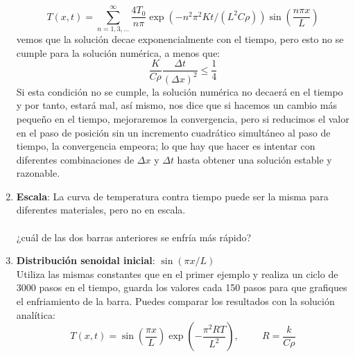 \documentclass[12pt]{article}
\begin{document}
\begin{enumerate}
\[ T(x,t) = \sum_{n=1,3,\ldots}^{\infty} \dfrac{4T_{0}}{n \pi} \exp(-n^{2} \pi^{2}Kt/(L^{2} C \rho)) \sin \left( \dfrac{n \pi x}{L} \right)  \]
vemos que la soluci\'{o}n decae exponencialmente con el tiempo, pero esto no se cumple para la soluci\'{o}n num\'{e}rica, a menos que:
\[ \dfrac{K}{C \rho} \dfrac{\Delta t}{(\Delta x)^{2}} \leq \dfrac{1}{4} \]
Si esta condici\'{o}n no se cumple, la soluci\'{o}n numérica no decaer\'{a} en el tiempo y por tanto, estar\'{a} mal, as\'{i} mismo, nos dice que si hacemos un cambio m\'{a}s pequeño en el tiempo, mejoraremos la convergencia, pero si reducimos el valor en el paso de posici\'{o}n sin un incremento cuadr\'{a}tico simult\'{a}neo al paso de tiempo, la convergencia empeora; lo que hay que hacer es intentar con diferentes combinaciones de $\Delta x$ y $\Delta t$ hasta obtener una soluci\'{o}n estable y razonable.
\item \textbf{Escala}: La curva de temperatura contra tiempo puede ser la misma para diferentes materiales, pero no en escala.
\\
\\
¿cu\'{a}l de las dos barras anteriores se enfr\'{i}a m\'{a}s r\'{a}pido?
\item \textbf{Distribuci\'{o}n senoidal inicial}: $\sin( \pi x / L)$
\\
Utiliza las mismas constantes que en el primer ejemplo y realiza un ciclo de 3000 pasos en el tiempo, guarda los valores cada 150 pasos para que grafiques el enfriamiento de la barra. Puedes comparar los resultados con la soluci\'{o}n anal\'{i}tica:
\[ T(x,t) = \sin \left( \dfrac{\pi x}{L} \right) \exp(-\dfrac{\pi^{2}RT}{L^{2}}), \hspace{1cm} R=\dfrac{k}{C \rho} \]
\end{enumerate}
\end{document}
